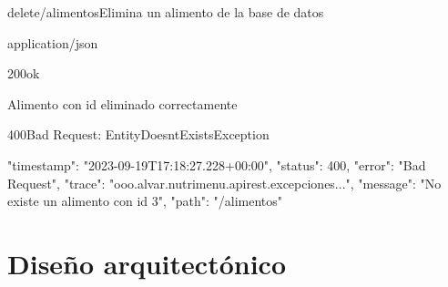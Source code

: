 \begin{table}
\begin{apiRoute}{delete}{/alimentos}{Elimina un alimento de la base de datos}
	\begin{routeParameter}
	\end{routeParameter}
	\begin{routeResponse}{application/json}
		\begin{routeResponseItem}{200}{ok}
			\begin{routeResponseItemBody}
Alimento con id eliminado correctamente	
			\end{routeResponseItemBody}
		\end{routeResponseItem}
		
	\begin{routeResponseItem}{400}{Bad Request: EntityDoesntExistsException}
			\begin{routeResponseItemBody}
{
    "timestamp": "2023-09-19T17:18:27.228+00:00",
    "status": 400,
    "error": "Bad Request",
    "trace": "ooo.alvar.nutrimenu.apirest.excepciones...",
    "message": "No existe un alimento con id 3",
    "path": "/alimentos"
}
			\end{routeResponseItemBody}
		\end{routeResponseItem}
		
	\end{routeResponse}
\end{apiRoute}
\caption{Endpoint que permite eliminar un alimento}
\end{table}

\section{Diseño arquitectónico}

